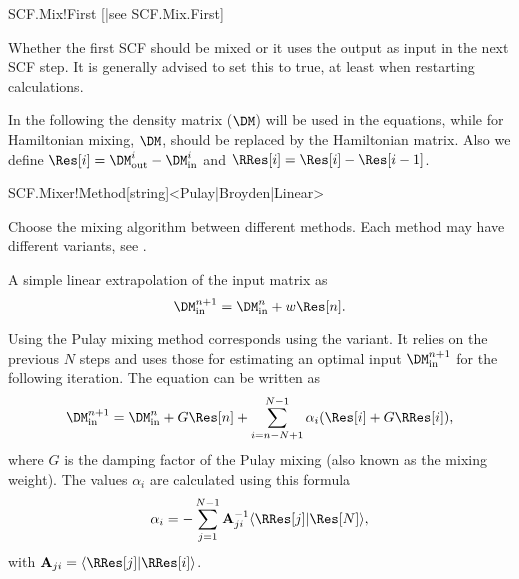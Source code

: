 \begin{fdflogicalT}{SCF.Mix!First}
  [|see SCF.Mix.First]

  Whether the first SCF should be mixed or it uses the output as input
  in the next SCF step. It is generally advised to set this to true,
  at least when restarting calculations.
  
\end{fdflogicalT}


In the following the density matrix ($\DM$) will be used in the
equations, while for Hamiltonian mixing, $\DM$, should be replaced by
the Hamiltonian matrix.
%
Also we define $\Res[i] = \DM^i_{\mathrm{out}} - \DM^i_{\mathrm{in}}$ and 
$\RRes[i] = \Res[i] - \Res[i-1]$.

\begin{fdfentry}{SCF.Mixer!Method}[string]<Pulay|Broyden|Linear>

  Choose the mixing algorithm between different methods. Each method
  may have different variants, see .
  
  \begin{fdfoptions}

    \option[Linear] %
    A simple linear extrapolation of the input matrix as
    \begin{equation}
      \DM^{n+1}_{\mathrm{in}} = \DM^n_{\mathrm{in}} + w \Res[n].
    \end{equation}


    \option[Pulay] %
    Using the Pulay mixing method corresponds using the
    \citet{Kresse1996} variant. It relies on the previous $N$ steps and
    uses those for estimating an optimal input
    $\DM^{n+1}_{\mathrm{in}}$ for the following iteration. The
    equation can be written as
    \begin{equation}
      \DM^{n+1}_{\mathrm{in}} = \DM^n_{\mathrm{in}} + G \Res[n]
      + \sum_{i=n-N+1}^{N-1} \alpha_i (\Res[i] + G \RRes[i]),
    \end{equation}
    where $G$ is the damping factor of the Pulay mixing (also known as
    the mixing weight).
    The values $\alpha_i$ are calculated using this formula
    \begin{equation}
      \alpha_i = - \sum_{j=1}^{N-1}\mathbf A_{ji}^{-1} 
         \langle \RRes[j] | \Res[N] \rangle,
    \end{equation}    
    with $\mathbf A_{ji} = \langle \RRes[j] | \RRes[i] \rangle$.


\end{fdfoptions}
\end{fdfentry}
